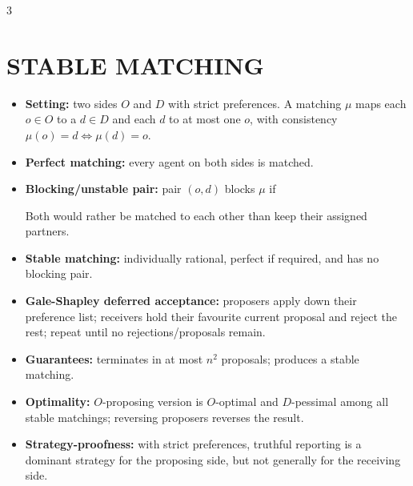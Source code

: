 \documentclass[a4paper]{article}
\newcommand{\term}[1]{\textbf{#1:}}
\newcommand{\formula}[1]{%
  \par\vspace{0.05ex}%
  \noindent\makebox[\linewidth][c]{%
    \adjustbox{max width=\linewidth}{$\displaystyle\begingroup\fontsize{6.60}{6.95}\selectfont #1\endgroup$}%
  }%
  \par\vspace{0.05ex}%
}
\begin{document}
\begin{multicols}{3}
\section*{STABLE MATCHING}
\begin{itemize}
\item \term{Setting} two sides $O$ and $D$ with strict preferences. A matching $\mu$ maps each $o\in O$ to a $d\in D$ and each $d$ to at most one $o$, with consistency $\mu(o)=d\Leftrightarrow\mu(d)=o$.
\item \term{Perfect matching} every agent on both sides is matched.
\item \term{Blocking/unstable pair} pair $(o,d)$ blocks $\mu$ if
\formula{d\succ_o\mu(o)\quad\text{and}\quad o\succ_d\mu(d).}
Both would rather be matched to each other than keep their assigned partners.
\item \term{Stable matching} individually rational, perfect if required, and has no blocking pair.
\item \term{Gale-Shapley deferred acceptance} proposers apply down their preference list; receivers hold their favourite current proposal and reject the rest; repeat until no rejections/proposals remain.
\item \term{Guarantees} terminates in at most $n^2$ proposals; produces a stable matching.
\item \term{Optimality} $O$-proposing version is $O$-optimal and $D$-pessimal among all stable matchings; reversing proposers reverses the result.
\item \term{Strategy-proofness} with strict preferences, truthful reporting is a dominant strategy for the proposing side, but not generally for the receiving side.
\end{itemize}

\end{multicols}
\end{document}
